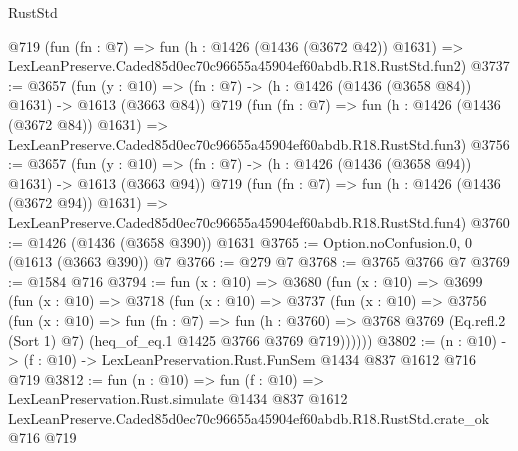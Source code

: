 \begin{lexlean}{RustStd}
\begin{coremodule}
    @719
    (fun (fn : @7) =>
    fun (h : @1426 (@1436 (@3672 @42)) @1631) =>
    LexLeanPreserve.Caded85d0ec70c96655a45904ef60abdb.R18.RustStd.fun2)
@3737 := @3657
    (fun (y : @10) => (fn : @7) -> (h : @1426 (@1436 (@3658 @84)) @1631) -> @1613 (@3663 @84))
    @719
    (fun (fn : @7) =>
    fun (h : @1426 (@1436 (@3672 @84)) @1631) =>
    LexLeanPreserve.Caded85d0ec70c96655a45904ef60abdb.R18.RustStd.fun3)
@3756 := @3657
    (fun (y : @10) => (fn : @7) -> (h : @1426 (@1436 (@3658 @94)) @1631) -> @1613 (@3663 @94))
    @719
    (fun (fn : @7) =>
    fun (h : @1426 (@1436 (@3672 @94)) @1631) =>
    LexLeanPreserve.Caded85d0ec70c96655a45904ef60abdb.R18.RustStd.fun4)
@3760 := @1426 (@1436 (@3658 @390)) @1631
@3765 := Option.noConfusion.{0, 0} (@1613 (@3663 @390)) @7
@3766 := @279 @7
@3768 := @3765 @3766 @7
@3769 := @1584 @716
@3794 := fun (x : @10) =>
  @3680
    (fun (x : @10) =>
    @3699
      (fun (x : @10) =>
      @3718
        (fun (x : @10) =>
        @3737
          (fun (x : @10) =>
          @3756
            (fun (x : @10) =>
            fun (fn : @7) =>
            fun (h : @3760) =>
            @3768 @3769 (Eq.refl.{2} (Sort 1) @7) (heq_of_eq.{1} @1425 @3766 @3769 @719))))))
@3802 := (n : @10) -> (f : @10) -> LexLeanPreservation.Rust.FunSem @1434 @837 @1612 @716 @719
@3812 := fun (n : @10) =>
  fun (f : @10) =>
  LexLeanPreservation.Rust.simulate
    @1434
    @837
    @1612
    LexLeanPreserve.Caded85d0ec70c96655a45904ef60abdb.R18.RustStd.crate_ok
    @716
    @719
\end{coremodule}
\end{lexlean}
